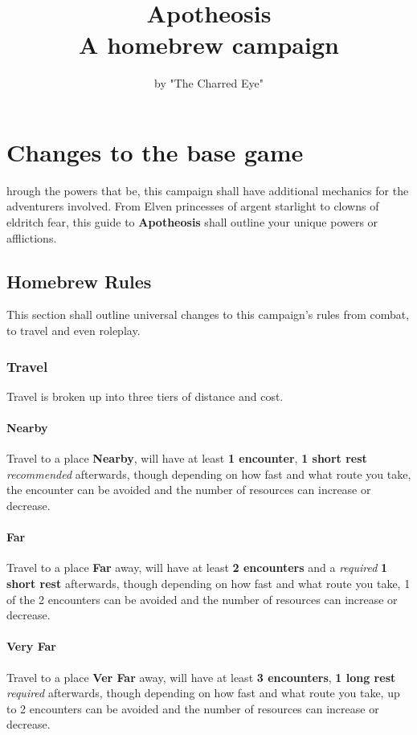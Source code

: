 \documentclass{apotheosis-book}
\title{Apotheosis \\
\large A homebrew campaign}
\author{by "The Charred Eye"}
\begin{document}
\frontmatter

\tableofcontents

\chapter{Changes to the base game}

hrough the powers that be, this campaign shall have additional mechanics for the adventurers involved. From Elven princesses of argent starlight to clowns of eldritch fear, this guide to \textbf{Apotheosis} shall outline your unique powers or afflictions.

\section{Homebrew Rules}
This section shall outline universal changes to this campaign's rules from combat, to travel and even roleplay.

\subsection{Travel}
Travel is broken up into three tiers of distance and cost.

\subsubsection{Nearby}
Travel to a place \textbf{Nearby}, will have at least \textbf{1 encounter}, \textbf{1 short rest} \textit{recommended} afterwards, though depending on how fast and what route you take, the encounter can be avoided and the number of resources can increase or decrease. 

\subsubsection{Far}
Travel to a place \textbf{Far} away, will have at least \textbf{2 encounters} and a \textit{required} \textbf{1 short rest} afterwards, though depending on how fast and what route you take, 1 of the 2 encounters can be avoided and the number of resources can increase or decrease.

\subsubsection{Very Far}
Travel to a place \textbf{Ver Far} away, will have at least \textbf{3 encounters}, \textbf{1 long rest} \textit{required} afterwards, though depending on how fast and what route you take, up to 2 encounters can be avoided and the number of resources can increase or decrease.
\end{document}
